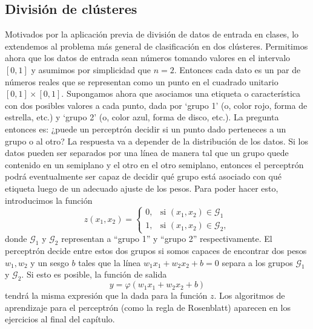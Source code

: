 \documentclass[12pt, a4paper]{amsbook}
\newcommand{\G}{{\mathcal G}}
\theoremstyle{remark}
\theoremstyle{definition}
\numberwithin{section}{chapter}
\numberwithin{subsection}{section}
\numberwithin{equation}{section}
\numberwithin{figure}{chapter}
\begin{document}
\subsection*{División de clústeres} Motivados por la aplicación previa de división de datos de entrada en clases, lo extendemos al problema más general de clasificación en dos clústeres. Permitimos ahora que los datos de entrada sean números tomando valores en el intervalo $[0,1]$ y asumimos por simplicidad que $n=2$. Entonces cada dato es un par de números reales que se representan como un punto en el cuadrado unitario $[0,1]\times [0,1]$. Supongamos ahora que asociamos una etiqueta o característica con dos posibles valores a cada punto, dada por `grupo 1' (o, color rojo, forma de estrella, etc.) y `grupo 2' (o, color azul, forma de disco, etc.). La pregunta entonces es: ¿puede un perceptrón decidir si un punto dado perteneces a un grupo o al otro? La respuesta va a depender de la distribución de los datos. Si los datos pueden ser separados por una línea de manera tal que un grupo quede contenido en un semiplano y el otro en el otro semiplano, entonces el perceptrón podrá eventualmente ser capaz de decidir qué grupo está asociado con qué etiqueta luego de un adecuado ajuste de los pesos. Para poder hacer esto, introducimos la función
$$
z(x_1, x_2) = \begin{cases}
0, & \text{si } (x_1, x_2)\in \G_1\\
1, & \text{si } (x_1, x_2)\in \G_2,
\end{cases}
$$
donde $\G_1$ y $\G_2$ representan a ``grupo 1'' y ``grupo 2'' respectivamente. El perceptrón decide entre estos dos grupos si somos capaces de encontrar dos pesos $w_1, w_2$ y un sesgo $b$ tales que la línea $w_1 x_1 + w_2 x_2 + b=0$ separa a los grupos $\G_1$ y $\G_2$. Si esto es posible, la función de salida
$$
y=\varphi(w_1 x_1 + w_2 x_2 + b)
$$
tendrá la misma expresión que la dada para la función $z$. Los algoritmos de aprendizaje para el perceptrón (como la regla de Rosenblatt) aparecen en los ejercicios al final del capítulo.
\end{document}
